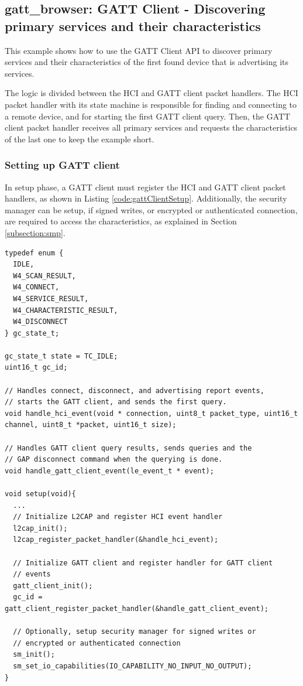 \documentclass[a4paper,titlepage,oneside,12pt]{amsart} %
\begin{document}
\subsection {gatt\_browser: GATT Client - Discovering primary services and their characteristics}
\label{example:gatt_browser}
This example shows how to use the GATT Client API to discover primary services and their characteristics of the first found device that is advertising its services.

The logic is divided between the HCI and GATT client packet handlers. The HCI packet handler with its state machine is responsible for finding and connecting to a remote device, and for starting the first GATT client query. Then, the GATT client packet handler receives all primary services and requests the characteristics of the last one to keep the example short.

\subsubsection{Setting up GATT client}
In setup phase, a GATT client must register the HCI and GATT client packet handlers, as shown in Listing \ref{code:gattClientSetup}. Additionally, the security manager can be setup, if signed writes, or encrypted or authenticated connection, are required to access the characteristics, as explained in Section \ref{subsection:smp}.  

\begin{lstlisting}[float, caption= Setting up GATT client., label=code:gattClientSetup]
typedef enum {
  IDLE,
  W4_SCAN_RESULT,
  W4_CONNECT,
  W4_SERVICE_RESULT,
  W4_CHARACTERISTIC_RESULT,
  W4_DISCONNECT
} gc_state_t;

gc_state_t state = TC_IDLE;
uint16_t gc_id;

// Handles connect, disconnect, and advertising report events,  
// starts the GATT client, and sends the first query.
void handle_hci_event(void * connection, uint8_t packet_type, uint16_t channel, uint8_t *packet, uint16_t size);

// Handles GATT client query results, sends queries and the 
// GAP disconnect command when the querying is done.
void handle_gatt_client_event(le_event_t * event);

void setup(void){
  ...
  // Initialize L2CAP and register HCI event handler
  l2cap_init();
  l2cap_register_packet_handler(&handle_hci_event);

  // Initialize GATT client and register handler for GATT client
  // events
  gatt_client_init();
  gc_id = gatt_client_register_packet_handler(&handle_gatt_client_event);  
  
  // Optionally, setup security manager for signed writes or 
  // encrypted or authenticated connection
  sm_init();
  sm_set_io_capabilities(IO_CAPABILITY_NO_INPUT_NO_OUTPUT);
}
\end{lstlisting}
\end{document}
